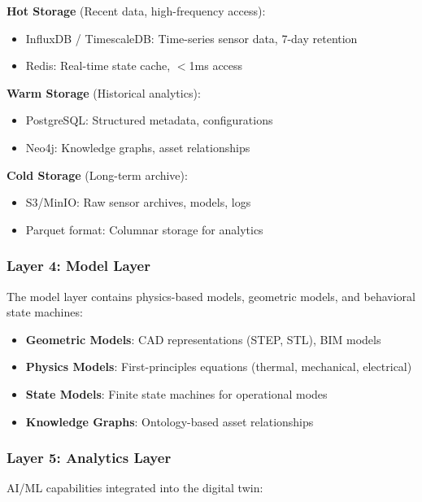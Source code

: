 \documentclass[12pt,a4paper]{article}
\begin{document}
\begin{tcolorbox}[colback=dataorange!10, colframe=dataorange, title=Data Storage Strategy]
\textbf{Hot Storage} (Recent data, high-frequency access):
\begin{itemize}
    \item InfluxDB / TimescaleDB: Time-series sensor data, 7-day retention
    \item Redis: Real-time state cache, $<$1ms access
\end{itemize}
\textbf{Warm Storage} (Historical analytics):
\begin{itemize}
    \item PostgreSQL: Structured metadata, configurations
    \item Neo4j: Knowledge graphs, asset relationships
\end{itemize}
\textbf{Cold Storage} (Long-term archive):
\begin{itemize}
    \item S3/MinIO: Raw sensor archives, models, logs
    \item Parquet format: Columnar storage for analytics
\end{itemize}
\end{tcolorbox}

\subsubsection{Layer 4: Model Layer}

The model layer contains physics-based models, geometric models, and behavioral state machines:

\begin{itemize}
    \item \textbf{Geometric Models}: CAD representations (STEP, STL), BIM models
    \item \textbf{Physics Models}: First-principles equations (thermal, mechanical, electrical)
    \item \textbf{State Models}: Finite state machines for operational modes
    \item \textbf{Knowledge Graphs}: Ontology-based asset relationships
\end{itemize}

\subsubsection{Layer 5: Analytics Layer}

AI/ML capabilities integrated into the digital twin:
\end{document}
